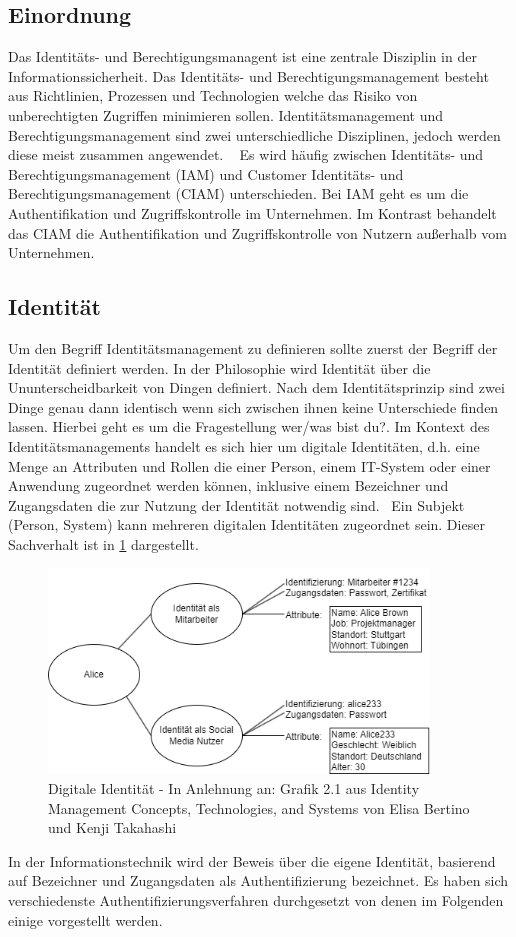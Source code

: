 \documentclass[12pt]{article}
\begin{document}
\subsection{Einordnung}
Das Identitäts- und Berechtigungsmanagent ist eine zentrale Disziplin in der Informationssicherheit. Das Identitäts- und Berechtigungsmanagement besteht aus Richtlinien, Prozessen und Technologien welche das Risiko von unberechtigten Zugriffen minimieren sollen. Identitätsmanagement und Berechtigungsmanagement sind zwei unterschiedliche Disziplinen, jedoch werden diese meist zusammen angewendet. ~\cite{mohammed2017systematic} Es wird häufig zwischen Identitäts- und Berechtigungsmanagement (IAM) und Customer Identitäts- und Berechtigungsmanagement (CIAM) unterschieden. Bei IAM geht es um die Authentifikation und Zugriffskontrolle im Unternehmen. Im Kontrast behandelt das CIAM die Authentifikation und Zugriffskontrolle von Nutzern außerhalb vom Unternehmen.~\cite{mohammed2017systematic} ~\cite{liveretos2022customer}
\subsection{Identität}
Um den Begriff Identitätsmanagement zu definieren sollte zuerst der Begriff der Identität definiert werden. In der Philosophie wird Identität über die Ununterscheidbarkeit von Dingen definiert. Nach dem Identitätsprinzip sind zwei Dinge genau dann identisch wenn sich zwischen ihnen keine Unterschiede finden lassen. Hierbei geht es um die Fragestellung \glqq{}wer/was bist du?\grqq{}. Im Kontext des Identitätsmanagements handelt es sich hier um digitale Identitäten, d.h. eine Menge an Attributen und Rollen die einer Person, einem IT-System oder einer Anwendung zugeordnet werden können, inklusive einem Bezeichner und Zugangsdaten die zur Nutzung der Identität notwendig sind.~\cite{tsolkas2017} Ein Subjekt (Person, System) kann mehreren digitalen Identitäten zugeordnet sein. Dieser Sachverhalt ist in \cref{fig:identity} dargestellt.
\begin{figure}[H]
  \label{fig:identity}
  \centering
  \includegraphics[width=0.9\textwidth]{assets/identity.png}
  \caption{Digitale Identität - In Anlehnung an: Grafik 2.1 aus Identity Management Concepts, Technologies, and Systems von Elisa Bertino und Kenji Takahashi}
\end{figure}
In der Informationstechnik wird der Beweis über die eigene Identität, basierend auf Bezeichner und Zugangsdaten als Authentifizierung bezeichnet. Es haben sich verschiedenste Authentifizierungsverfahren durchgesetzt von denen im Folgenden einige vorgestellt werden.
\end{document}
